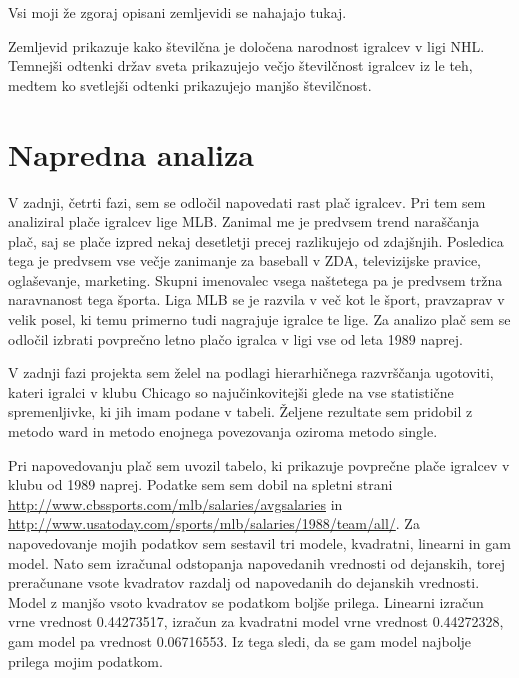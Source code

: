 \documentclass[11pt,a4paper]{article}
\begin{document}
Vsi moji že zgoraj opisani zemljevidi se nahajajo tukaj.




Zemljevid prikazuje kako številčna je določena narodnost igralcev v ligi NHL.
Temnejši odtenki držav sveta prikazujejo večjo številčnost igralcev iz le teh, medtem ko svetlejši odtenki prikazujejo manjšo številčnost. 



\pagebreak
\section{Napredna analiza}

V zadnji, četrti fazi, sem se odločil napovedati rast plač igralcev. Pri tem sem analiziral plače igralcev lige MLB. Zanimal me je predvsem trend naraščanja plač, saj se plače izpred nekaj desetletji precej razlikujejo od zdajšnjih. Posledica tega je predvsem vse večje zanimanje za baseball v ZDA, televizijske pravice, oglaševanje, marketing. Skupni imenovalec vsega naštetega pa je predvsem tržna naravnanost tega športa. Liga MLB se je razvila v več kot le šport, pravzaprav v velik posel, ki temu primerno tudi nagrajuje igralce te lige. Za analizo plač sem se odločil izbrati povprečno letno plačo igralca v ligi vse od leta 1989 naprej.

V zadnji fazi projekta sem želel na podlagi hierarhičnega razvrščanja ugotoviti, kateri igralci v klubu Chicago so najučinkovitejši glede na vse statistične spremenljivke, ki jih imam podane v tabeli. Željene rezultate sem pridobil z metodo ward in metodo enojnega povezovanja oziroma metodo single.

Pri napovedovanju plač sem uvozil tabelo, ki prikazuje povprečne plače igralcev v klubu od 1989 naprej. Podatke sem sem dobil na spletni strani \url{http://www.cbssports.com/mlb/salaries/avgsalaries} in \url{http://www.usatoday.com/sports/mlb/salaries/1988/team/all/}.
Za napovedovanje mojih podatkov  sem sestavil tri modele, kvadratni, linearni in gam model. Nato sem izračunal odstopanja napovedanih vrednosti od dejanskih, torej preračunane vsote kvadratov razdalj od napovedanih do dejanskih vrednosti. Model z manjšo vsoto kvadratov se podatkom boljše prilega. Linearni izračun vrne vrednost 0.44273517, izračun za kvadratni model vrne vrednost 0.44272328, gam model pa vrednost 0.06716553. Iz tega sledi, da se gam model najbolje prilega mojim podatkom.
\end{document}
